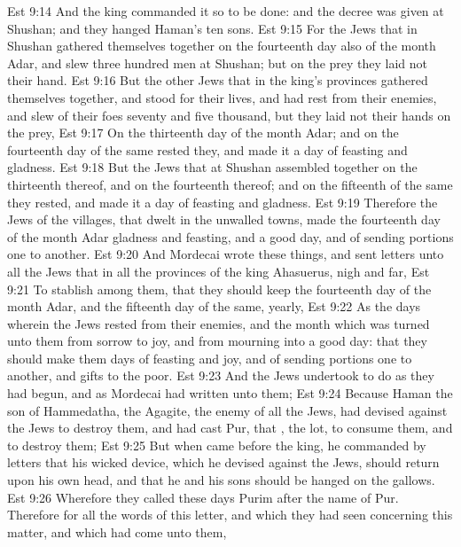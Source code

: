 \vs Est 9:14 And the king commanded it so to be done: and the decree was given at Shushan; and they hanged Haman's ten sons.
\vs Est 9:15 For the Jews that  in Shushan gathered themselves together on the fourteenth day also of the month Adar, and slew three hundred men at Shushan; but on the prey they laid not their hand.
\vs Est 9:16 But the other Jews that  in the king's provinces gathered themselves together, and stood for their lives, and had rest from their enemies, and slew of their foes seventy and five thousand, but they laid not their hands on the prey,
\vs Est 9:17 On the thirteenth day of the month Adar; and on the fourteenth day of the same rested they, and made it a day of feasting and gladness.
\vs Est 9:18 But the Jews that  at Shushan assembled together on the thirteenth  thereof, and on the fourteenth thereof; and on the fifteenth  of the same they rested, and made it a day of feasting and gladness.
\vs Est 9:19 Therefore the Jews of the villages, that dwelt in the unwalled towns, made the fourteenth day of the month Adar  gladness and feasting, and a good day, and of sending portions one to another.
\vs Est 9:20 And Mordecai wrote these things, and sent letters unto all the Jews that  in all the provinces of the king Ahasuerus,  nigh and far,
\vs Est 9:21 To stablish  among them, that they should keep the fourteenth day of the month Adar, and the fifteenth day of the same, yearly,
\vs Est 9:22 As the days wherein the Jews rested from their enemies, and the month which was turned unto them from sorrow to joy, and from mourning into a good day: that they should make them days of feasting and joy, and of sending portions one to another, and gifts to the poor.
\vs Est 9:23 And the Jews undertook to do as they had begun, and as Mordecai had written unto them;
\vs Est 9:24 Because Haman the son of Hammedatha, the Agagite, the enemy of all the Jews, had devised against the Jews to destroy them, and had cast Pur, that , the lot, to consume them, and to destroy them;
\vs Est 9:25 But when  came before the king, he commanded by letters that his wicked device, which he devised against the Jews, should return upon his own head, and that he and his sons should be hanged on the gallows.
\vs Est 9:26 Wherefore they called these days Purim after the name of Pur. Therefore for all the words of this letter, and  which they had seen concerning this matter, and which had come unto them,
